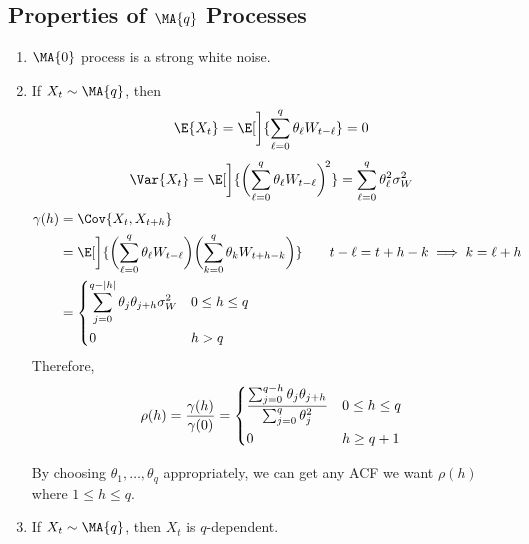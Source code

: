 \subsection*{Properties of $ \MA{q} $ Processes}
\begin{enumerate}[(1)]
    \item $ \MA{0} $ process is a strong white noise.
    \item If $ X_t\sim\MA{q} $, then
          \[ \E{X_t}=\E[\bigg]{\sum_{\ell=0}^{q} \theta_\ell W_{t-\ell}}=0 \]
          \[ \Var{X_t}=\E[\bigg]{\biggl(\sum_{\ell=0}^{q} \theta_\ell W_{t-\ell}\biggr)^{\!2}}=
              \sum_{\ell=0}^{q} \theta_\ell^2\sigma_W^2 \]
          \begin{align*}
              \gamma(h)
                                                               & =\Cov{X_t,X_{t+h}}                                                                                \\
                                                               & =\E[\bigg]{\biggl(\sum_{\ell=0}^{q} \theta_\ell W_{t-\ell}\biggr)
              \biggl(\sum_{k=0}^{q} \theta_k W_{t+h-k}\biggr)} & \quad                                                             & t-\ell=t+h-k\implies k=\ell+h \\
                                                               & =\begin{dcases}
                  \sum_{j=0}^{q-\abs{h}} \theta_j \theta_{j+h}\sigma_W^2 & 0\le h\le q \\
                  0                                                      & h>q
              \end{dcases}
          \end{align*}
          Therefore,
          \[ \rho(h)=\frac{\gamma(h)}{\gamma(0)} =
              \begin{dcases}
                  \frac{\sum_{j=0}^{q-h} \theta_j \theta_{j+h}}{\sum_{j=0}^{q} \theta_j^2} & 0\le h\le q \\
                  0                                                                        & h\ge q+1
              \end{dcases} \]
          \begin{Remark}{}{}
              By choosing $ \theta_1,\ldots,\theta_q $ appropriately, we can
              get any ACF we want $ \rho(h) $ where $ 1\le h\le q $.
          \end{Remark}
    \item If $ X_t\sim\MA{q} $, then $ X_t $ is $ q $-dependent.
\end{enumerate}
